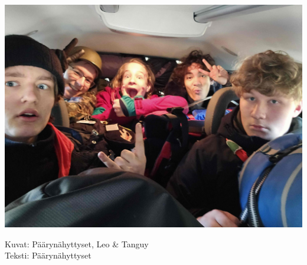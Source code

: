 \begin{multicols}{2}
\smallskip
\noindent\includegraphics[width=1.0\linewidth]{assets/telttaretki2}

\end{multicols}

\noindent\null\hfill Kuvat: Päärynähyttyset, Leo \& Tanguy\\
\noindent\null\hfill Teksti: Päärynähyttyset
